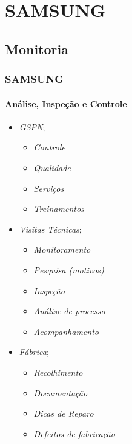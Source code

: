 \documentclass[aspectratio=169]{beamer}
\begin{document}
	\section{SAMSUNG}
	\subsection{Monitoria}
	\begin{frame}
		\frametitle{SAMSUNG}
		\framesubtitle{Análise, Inspeção e Controle}
		
		\begin{minipage}[H]{.4\textwidth}
			\begin{itemize}
				\item \textit{GSPN};
				\begin{itemize}
					\item \textit{Controle}
					\item \textit{Qualidade}
					\item \textit{Serviços}
					\item \textit{Treinamentos}
				\end{itemize}
			\end{itemize}
		\end{minipage}
		\hfill
		\begin{minipage}[H]{.4\textwidth}
			\begin{itemize}
				\item \textit{Visitas Técnicas};
				\begin{itemize}
					\item \textit{Monitoramento}
					\item \textit{Pesquisa (motivos)}
					\item \textit{Inspeção}
					\item \textit{Análise de processo}
					\item \textit{Acompanhamento}
				\end{itemize}
			\end{itemize}
		\end{minipage}
		\hfill
		\begin{minipage}[H]{.4\textwidth}
			\begin{itemize}
				\item \textit{Fábrica};
				\begin{itemize}
					\item \textit{Recolhimento}
					\item \textit{Documentação}
					\item \textit{Dicas de Reparo}
					\item \textit{Defeitos de fabricação}
				\end{itemize}
			\end{itemize}
		\end{minipage}
	\end{frame}
	
\end{document}
